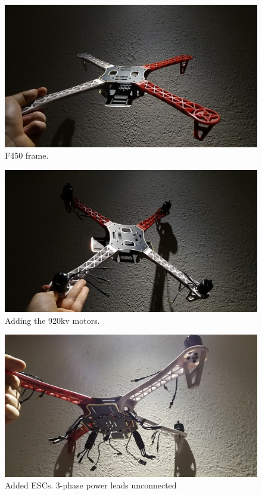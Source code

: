 \begin{figure}
\centering
\includegraphics[scale=0.1]{images/drone-build-frame.jpg}
\caption{F450 frame.}
\label{fig:frame}
\end{figure}

\begin{figure}
\centering
\includegraphics[scale=0.1]{images/drone-build-motors.jpg}
\caption{Adding the 920kv motors.}
\label{fig:frame}
\end{figure}

\begin{figure}
\centering
\includegraphics[scale=0.1]{images/drone-build-esc-3phaseunconnected.jpg}
\caption{Added ESCs. 3-phase power leads unconnected}
\label{fig:frame}
\end{figure}

